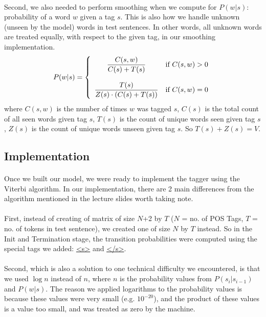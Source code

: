 \documentclass[12pt]{article}
\begin{document}
\paragraph{}
Second, we also needed to perform smoothing when we compute for $P(w|s)$: probability of a word $w$ given a tag $s$. This is also how we handle unknown (unseen by the model) words in test sentences. In other words, all unknown words are treated equally, with respect to the given tag, in our smoothing implementation.
\begin{equation}
\label{eq2}
P(w | s) = \left\{ 
					\begin{array}{c l}
					\displaystyle \frac{C(s, w)}{C(s) + T(s)} & \textrm{if}~C(s, w) > 0 \\\\
					\displaystyle \frac{T(s)}{Z(s) \cdot (C(s) + T(s))} & \textrm{if}~C(s, w) = 0
					\end{array}
					\right.
\end{equation}
where $C(s,w)$ is the number of times $w$ was tagged $s$, $C(s)$ is the total count of all seen words given tag $s$, $T(s)$ is the count of unique words seen given tag $s$, $Z(s)$ is the count of unique words unseen given tag $s$. So $T(s) + Z(s) = V$.

\subsection{Implementation}
\paragraph{}
Once we built our model, we were ready to implement the tagger using the Viterbi algorithm. In our implementation, there are 2 main differences from the algorithm mentioned in the lecture slides worth taking note.

\paragraph{}
First, instead of creating of matrix of size $N$+2 by $T$ ($N$ = no. of POS Tags, $T$ = no. of tokens in test sentence), we created one of size $N$ by $T$ instead. So in the Init and Termination stage, the transition probabilities were computed using the special tags we added: \url{<s>} and \url{</s>}.

\paragraph{}
Second, which is also a solution to one technical difficulty we encountered, is that we used $\log{n}$ instead of $n$, where $n$ is the probability values from $P(s_{i}|s_{i-1})$ and $P(w|s)$. The reason we applied logarithms to the probability values is because these values were very small (e.g. $10^{-20}$), and the product of these values is a value too small, and was treated as zero by the machine.
\end{document}
